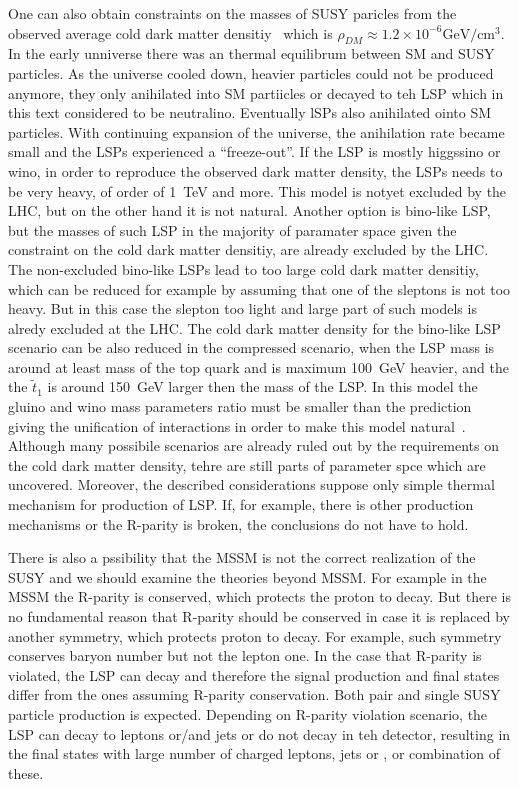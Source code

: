One can also obtain constraints on the masses of SUSY paricles from the observed average cold dark matter densitiy~\cite{Ade:2015xua, Patrignani:2016xqp} which is  $\rho_{DM} \approx 1.2 \times 10^{-6} \mathrm{GeV/cm^{3}}$.  In the early unniverse there was an thermal equilibrum between SM and SUSY particles. As the universe cooled down, heavier particles could not be produced anymore, they only anihilated into SM partiicles or decayed to teh LSP which in this text considered to be neutralino. Eventually lSPs also anihilated ointo SM particles. With continuing expansion of the universe, the anihilation rate became small and the LSPs experienced a ``freeze-out''. If the LSP is mostly higgssino or wino, in order to reproduce the observed dark matter density, the LSPs needs to be very heavy, of order of 1~TeV and more. This model is notyet excluded by the LHC, but on the other hand it is not natural. Another option is bino-like LSP, but the masses of such LSP in the majority of paramater space given the constraint on the cold dark matter densitiy, are already excluded by the LHC. The non-excluded bino-like LSPs lead to too large cold dark matter densitiy, which can be reduced for example by assuming that one of the sleptons is not too heavy.  But in this case the slepton too light and large part of such models is alredy excluded at the LHC. The cold dark matter density for the bino-like LSP scenario can be also reduced in the compressed scenario, when the LSP mass is around at least mass of the top quark and is maximum 100~GeV heavier, and the the $\tilde{t}_{1}$ is around 150~GeV larger then the mass of the LSP. In this model the gluino and wino mass parameters ratio must be smaller than the prediction giving the unification of interactions in order to make this model natural~\cite{Martin:2008aw}. Although many possibile scenarios are already ruled out by the requirements on the cold dark matter density, tehre are still parts of parameter spce which are uncovered. Moreover, the described considerations suppose only simple thermal mechanism for production of LSP. If, for example, there is other production mechanisms or the R-parity is broken, the conclusions do not have to hold.

There is also a pssibility that the MSSM is not the correct realization of the SUSY and we should examine the theories beyond MSSM. For example in the MSSM the R-parity is conserved, which protects the proton to decay. But there is no fundamental reason that R-parity should be conserved in case it is replaced by another symmetry, which protects proton to decay. For example, such symmetry conserves baryon number but not the lepton one. In the case that R-parity is violated, the LSP can decay and therefore the signal production and final states differ from the ones assuming R-parity conservation. Both pair and single SUSY particle production is expected. Depending on R-parity violation scenario, the LSP can decay to leptons or/and jets or do not decay in teh detector, resulting in the final states with large number of charged leptons, jets or \MET, or combination of these.


